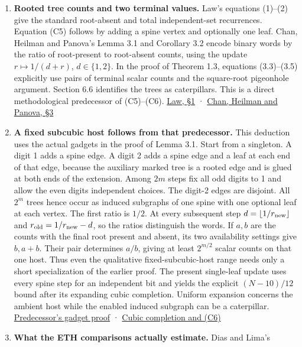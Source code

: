 \documentclass[
  11pt,
]{article}
\begin{document}
\begin{enumerate}
\def\labelenumi{\arabic{enumi}.}
\item
  \textbf{Rooted tree counts and two terminal values.} Law's equations
  (1)--(2) give the standard root-absent and total independent-set
  recurrences. Equation (C5) follows by adding a spine vertex and
  optionally one leaf. Chan, Heilman and Panova's Lemma 3.1 and
  Corollary 3.2 encode binary words by the ratio of root-present to
  root-absent counts, using the update \(r\mapsto 1/(d+r)\),
  \(d\in\{1,2\}\). In the proof of Theorem 1.3, equations (3.3)--(3.5)
  explicitly use pairs of terminal scalar counts and the square-root
  pigeonhole argument. Section 6.6 identifies the trees as caterpillars.
  This is a direct methodological predecessor of (C5)--(C6).
  \href{https://www.combinatorics.org/ojs/index.php/eljc/article/download/v17i1n18/pdf/}{Law,
  §1} · \href{https://arxiv.org/html/2604.19094v1\#S3}{Chan, Heilman and
  Panova, §3}
\item
  \textbf{A fixed subcubic host follows from that predecessor.} This
  deduction uses the actual gadgets in the proof of Lemma 3.1. Start
  from a singleton. A digit 1 adds a spine edge. A digit 2 adds a spine
  edge and a leaf at each end of that edge, because the auxiliary marked
  tree is a rooted edge and is glued at both ends of the extension.
  Among \(2m\) steps fix all odd digits to 1 and allow the even digits
  independent choices. The digit-2 edges are disjoint. All \(2^m\) trees
  hence occur as induced subgraphs of one spine with one optional leaf
  at each vertex. The first ratio is \(1/2\). At every subsequent step
  \(d=\lfloor1/r_{\rm new}\rfloor\) and \(r_{\rm old}=1/r_{\rm new}-d\),
  so the ratios distinguish the words. If \(a,b\) are the counts with
  the final root present and absent, its two availability settings give
  \(b,a+b\). Their pair determines \(a/b\), giving at least \(2^{m/2}\)
  scalar counts on that one host. Thus even the qualitative
  fixed-subcubic-host range needs only a short specialization of the
  earlier proof. The present single-leaf update uses every spine step
  for an independent bit and yields the explicit \((N-10)/12\) bound
  after its expanding cubic completion. Uniform expansion concerns the
  ambient host while the enabled induced subgraph can be a caterpillar.
  \href{https://arxiv.org/html/2604.19094v1\#S3}{Predecessor's gadget
  proof} · \hyperref[v8-section-pooled-menu-barrier]{Cubic completion and
  (C6)}
\item
  \textbf{What the ETH comparisons actually estimate.} Dias and Lima's

\end{enumerate}
\end{document}
